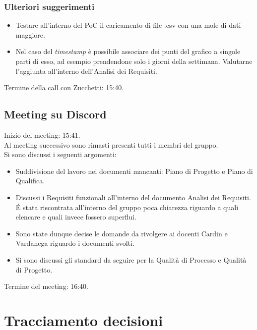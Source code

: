 \subsubsection{Ulteriori suggerimenti}
\begin{itemize}
	\item Testare all'interno del PoC il caricamento di file .csv con una mole di dati maggiore.
	\item Nel caso del \textit{timestamp} è possibile associare dei punti del grafico a singole parti di esso, ad esempio prendendone solo i giorni della settimana. Valutarne l'aggiunta all'interno dell'Analisi dei Requisiti.
\end{itemize}

\noindent Termine della call con Zucchetti: 15:40.

\subsection{Meeting su Discord}
\noindent 
Inizio del meeting: 15:41. \\
\noindent Al meeting successivo sono rimasti presenti tutti i membri del gruppo. \\
Si sono discussi i seguenti argomenti:
\begin{itemize}
	\item Suddivisione del lavoro nei documenti mancanti: Piano di Progetto e Piano di Qualifica.
	\item Discussi i Requisiti funzionali all'interno del documento Analisi dei Requisiti. \' E stata riscontrata all'interno del gruppo poca chiarezza riguardo a quali elencare e quali invece fossero superflui.
	\item Sono state dunque decise le domande da rivolgere ai docenti Cardin e Vardanega riguardo i documenti svolti.
	\item Si sono discussi gli standard da seguire per la Qualità di Processo e Qualità di Progetto.
\end{itemize}

\noindent Termine del meeting: 16:40.


\section{Tracciamento decisioni}


